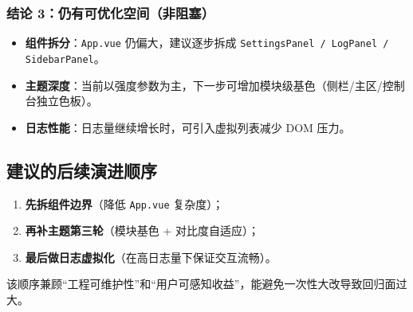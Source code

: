 \subsubsection{结论 3：仍有可优化空间（非阻塞）}
\begin{itemize}
  \item \textbf{组件拆分}：\texttt{App.vue} 仍偏大，建议逐步拆成 \texttt{SettingsPanel / LogPanel / SidebarPanel}。
  \item \textbf{主题深度}：当前以强度参数为主，下一步可增加模块级基色（侧栏/主区/控制台独立色板）。
  \item \textbf{日志性能}：日志量继续增长时，可引入虚拟列表减少 DOM 压力。
\end{itemize}

\subsection{建议的后续演进顺序}

\begin{enumerate}
  \item \textbf{先拆组件边界}（降低 \texttt{App.vue} 复杂度）；
  \item \textbf{再补主题第三轮}（模块基色 + 对比度自适应）；
  \item \textbf{最后做日志虚拟化}（在高日志量下保证交互流畅）。
\end{enumerate}

该顺序兼顾“工程可维护性”和“用户可感知收益”，能避免一次性大改导致回归面过大。

